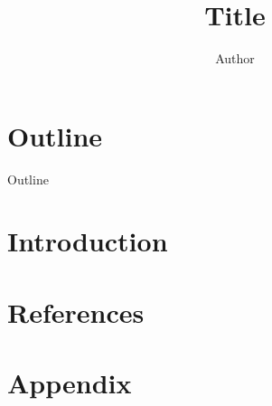 \documentclass[hyperref={pdfpagelabels=false}]{beamer}
\title[]{Title}
\subtitle[]{}
\author[]{Author}
\institute[]{The Ohio State University}
\date{}
\begin{document}
\titlepage     %

\section*{Outline}     %

\begin{frame}{Outline}
  \tableofcontents
\end{frame}

\section{Introduction}     %

\begin{frame}{}     %

\end{frame}



\section*{References}     %

\begin{frame}{}

\end{frame}

\section*{Appendix}     %
\subsection*{}

\begin{frame}{}
\end{frame}
\end{document}
